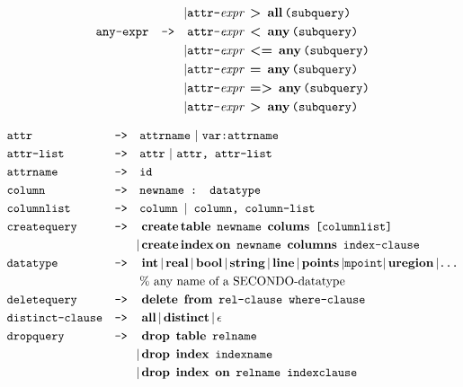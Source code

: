 \begin{align*}
&&|&\texttt{attr-}\textit{expr}\ \operatorname{\textbf{>}}\ \operatorname{\textbf{all}}\texttt{(subquery)} \\
&\texttt{any-expr} &\texttt{-->}\quad &\texttt{attr-}\textit{expr}\ \operatorname{\textbf{<}}\ \operatorname{\textbf{any}}\texttt{(subquery)} \\
&&|&\texttt{attr-}\textit{expr}\ \operatorname{\textbf{<=}}\ \operatorname{\textbf{any}}\texttt{(subquery)} \\
&&|&\texttt{attr-}\textit{expr}\ \operatorname{\textbf{=}}\ \operatorname{\textbf{any}}\texttt{(subquery)} \\
&&|&\texttt{attr-}\textit{expr}\ \operatorname{\textbf{=>}}\ \operatorname{\textbf{any}}\texttt{(subquery)} \\
&&|&\texttt{attr-}\textit{expr}\ \operatorname{\textbf{>}}\ \operatorname{\textbf{any}}\texttt{(subquery)} \\
\end{align*}

\begin{align*}
&\texttt{attr} &\texttt{-->}\quad &\texttt{attrname}\ |\ \texttt{var:attrname}\\
&\texttt{attr-list} &\texttt{-->}\quad &\texttt{attr}\ |\ \texttt{attr, attr-list}\\
&\texttt{attrname}&\texttt{-->}\quad &\texttt{id}									\\
&\texttt{column}&\texttt{-->}\quad &\texttt{newname : datatype}									\\
&\texttt{columnlist}&\texttt{-->}\quad &\texttt{column }	|\texttt{ column, column-list}								\\
&\texttt{createquery}&\texttt{-->}\quad &\op{create} \op{table}\ \texttt{newname}\ \op{colums}\ \texttt{[columnlist]} 	\\
&&|&\op{create} \op{index} \op{on}\ \texttt{newname}\ \op{columns}\ \texttt{index-clause}								\\
&\texttt{datatype}&\texttt{-->}\quad &\op{int}	|\op{real}	|\op{bool}	|\op{string}	|\op{line}	|\op{points}	|\texttt{mpoint}	|\op{uregion}	|\texttt{\dots}\\
&&&\text{\% any name of a SECONDO-datatype}	\\
&\texttt{deletequery}&\texttt{-->}\quad &\op{delete}\ \op{from}\ \texttt{rel-clause where-clause}									\\
&\texttt{distinct-clause}&\texttt{-->}\quad &\op{all}	|\op{distinct}	|\op{$\epsilon$}							\\
&\texttt{dropquery}&\texttt{-->}\quad &\op{drop}\ \op{table}\ \texttt{relname} \\
&&|&\op{drop}\ \op{index}\ \texttt{indexname}	\\
&&|&\op{drop}\ \op{index}\ \op{on}\ \texttt{relname indexclause}							\\

\end{align*}
